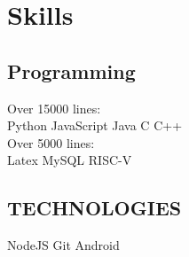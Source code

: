 \documentclass[letterpaper]{deedy-resume}
\begin{document}
\begin{minipage}[t]{0.29\textwidth}
\sectionspace 

\section{Skills}

\subsection{Programming}
Over 15000 lines: \\
Python \textbullet{} JavaScript \textbullet{} Java \textbullet{} C \textbullet{} C++  \\
Over 5000 lines: \\
Latex \textbullet{} MySQL \textbullet{} RISC-V 

\sectionspace

\subsection{TECHNOLOGIES}
NodeJS \textbullet{} Git \textbullet{} Android
\sectionspace 


\end{minipage} 
\hfill
%
%
\end{document}
